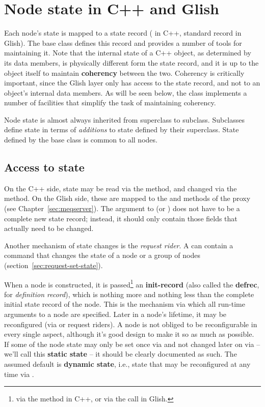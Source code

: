 \section{Node state in C++ and Glish}
  
  Each node's state is mapped to a state record ( in C++,
  standard record in Glish). The base  class defines this record and
  provides a number of tools for maintaining it. Note that the internal state
  of a C++ object, as determined by its data members, is physically different 
  form the state record, and it is up to the object itself to maintain {\bf
  coherency} between the two. Coherency is critically important, since the
  Glish layer only has access to the state record, and not to an object's
  internal data members. As will be seen below, the  class implements
  a number of facilities that simplify the task of maintaining coherency.
  
  Node state is almost always inherited from superclass to subclass. Subclasses
  define state in terms of {\em additions\/} to state defined by their
  superclass. State defined by the base  class is common to all nodes.

\subsection{Access to state}

  On the C++ side, state may be read via the  method, and
  changed via the  method. On the Glish side, these are
  mapped to the  and  methods of the
   proxy (see Chapter~\ref{sec:meqserver}). The argument to
   (or ) does not have to be a complete new
  state record; instead, it should only contain those fields that actually need
  to be changed. 
  
  Another mechanism of state changes is the {\em request rider}. A 
  can contain a command that changes the state of a node or a group of nodes
  (section~\ref{sec:request-set-state}).

  When a node is constructed, it is passed\footnote{ via the  method
  in C++, or via the  call in  Glish.} an {\bf init-record}
  (also called the {\bf defrec}, for {\em definition record\/}), which is
  nothing more and nothing less than the complete initial state record of the
  node. This is the mechanism via which all run-time arguments to a node are
  specified. Later in a node's lifetime, it may be reconfigured (via
   or request riders). A node is not obliged to be
  reconfigurable in every single aspect, although it's good design to make it
  so as much as possible. If some of the node state may only be set once via
   and not changed later on via  -- we'll call this
  {\bf static state} -- it should be clearly documented as such. The assumed
  default is {\bf  dynamic state}, i.e., state that may be reconfigured at any
  time via .
  
